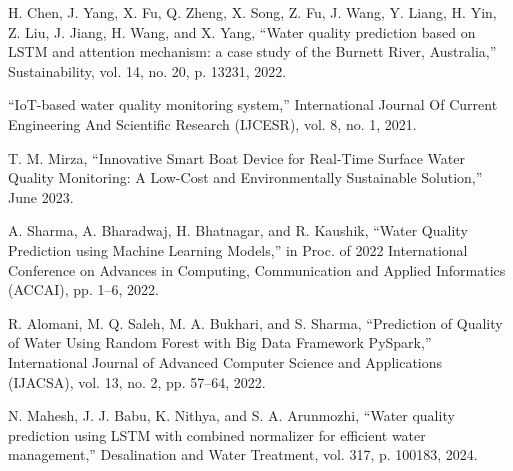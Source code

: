 \documentclass[conference]{IEEEtran}
\begin{document}
\begin{thebibliography}{00}
 H. Chen, J. Yang, X. Fu, Q. Zheng, X. Song, Z. Fu, J. Wang, Y. Liang, H. Yin, Z. Liu, J. Jiang, H. Wang, and X. Yang, ``Water quality prediction based on LSTM and attention mechanism: a case study of the Burnett River, Australia,'' Sustainability, vol. 14, no. 20, p. 13231, 2022.

 ``IoT-based water quality monitoring system,'' International Journal Of Current Engineering And Scientific Research (IJCESR), vol. 8, no. 1, 2021.

 T. M. Mirza, ``Innovative Smart Boat Device for Real-Time Surface Water Quality Monitoring: A Low-Cost and Environmentally Sustainable Solution,'' June 2023.

 A. Sharma, A. Bharadwaj, H. Bhatnagar, and R. Kaushik, ``Water Quality Prediction using Machine Learning Models,'' in Proc. of 2022 International Conference on Advances in Computing, Communication and Applied Informatics (ACCAI), pp. 1--6, 2022.

 R. Alomani, M. Q. Saleh, M. A. Bukhari, and S. Sharma, ``Prediction of Quality of Water Using Random Forest with Big Data Framework PySpark,'' International Journal of Advanced Computer Science and Applications (IJACSA), vol. 13, no. 2, pp. 57--64, 2022.

 N. Mahesh, J. J. Babu, K. Nithya, and S. A. Arunmozhi, ``Water quality prediction using LSTM with combined normalizer for efficient water management,'' Desalination and Water Treatment, vol. 317, p. 100183, 2024.
\end{thebibliography}
\end{document}
